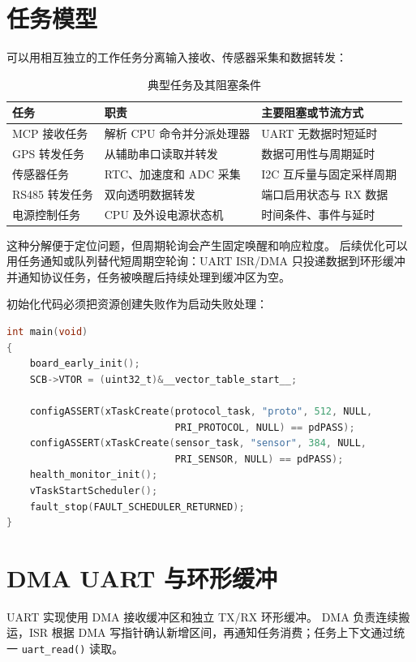 \section{任务模型}

可以用相互独立的工作任务分离输入接收、传感器采集和数据转发：

\begin{table}[htbp]
  \centering
  \caption{典型任务及其阻塞条件}
  \begin{tabular}{p{34mm}p{55mm}p{55mm}}
    \hline
    任务 & 职责 & 主要阻塞或节流方式 \\
    \hline
    MCP 接收任务 & 解析 CPU 命令并分派处理器 & UART 无数据时短延时 \\
    GPS 转发任务 & 从辅助串口读取并转发 & 数据可用性与周期延时 \\
    传感器任务 & RTC、加速度和 ADC 采集 & I2C 互斥量与固定采样周期 \\
    RS485 转发任务 & 双向透明数据转发 & 端口启用状态与 RX 数据 \\
    电源控制任务 & CPU 及外设电源状态机 & 时间条件、事件与延时 \\
    \hline
  \end{tabular}
\end{table}

这种分解便于定位问题，但周期轮询会产生固定唤醒和响应粒度。
后续优化可以用任务通知或队列替代短周期空轮询：UART ISR/DMA 只投递数据到环形缓冲并通知协议任务，任务被唤醒后持续处理到缓冲区为空。

初始化代码必须把资源创建失败作为启动失败处理：

\begin{lstlisting}[language=C,caption={可检查的 FreeRTOS 启动骨架}]
int main(void)
{
    board_early_init();
    SCB->VTOR = (uint32_t)&__vector_table_start__;

    configASSERT(xTaskCreate(protocol_task, "proto", 512, NULL,
                             PRI_PROTOCOL, NULL) == pdPASS);
    configASSERT(xTaskCreate(sensor_task, "sensor", 384, NULL,
                             PRI_SENSOR, NULL) == pdPASS);
    health_monitor_init();
    vTaskStartScheduler();
    fault_stop(FAULT_SCHEDULER_RETURNED);
}
\end{lstlisting}

\section{DMA UART 与环形缓冲}

UART 实现使用 DMA 接收缓冲区和独立 TX/RX 环形缓冲。
DMA 负责连续搬运，ISR 根据 DMA 写指针确认新增区间，再通知任务消费；任务上下文通过统一 \texttt{uart\_read()} 读取。

